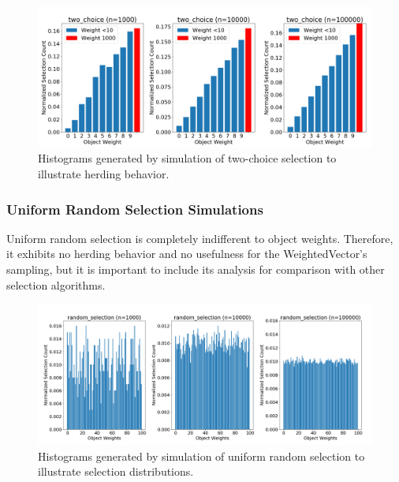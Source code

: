 \documentclass[12pt]{article}
\begin{document}
    \begin{figure}[htbp]
      \centering
      \includegraphics[scale=0.32]{images/pathological_two_choice.png} 
      \caption{Histograms generated by simulation of two-choice selection
               to illustrate herding behavior.}
      \label{fig:pathological_two_choice}
    \end{figure}

    \FloatBarrier

    \subsubsection{Uniform Random Selection Simulations}
    Uniform random selection is completely indifferent to object weights.
    Therefore, it exhibits no herding behavior and no usefulness for the
    WeightedVector's sampling, but it is important to include its analysis for
    comparison with other selection algorithms.

    \begin{figure}[htbp]
      \centering
      \includegraphics[scale=0.32]{images/herding_random.png} 
      \caption{Histograms generated by simulation of uniform random selection
               to illustrate selection distributions.}
      \label{fig:herding_random}
    \end{figure}
\end{document}
